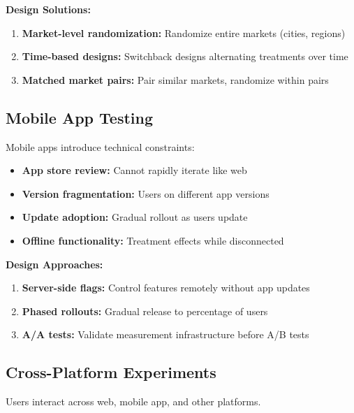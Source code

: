 \textbf{Design Solutions:}

\begin{enumerate}
    \item \textbf{Market-level randomization:} Randomize entire markets (cities, regions)

    \item \textbf{Time-based designs:} Switchback designs alternating treatments over time

    \item \textbf{Matched market pairs:} Pair similar markets, randomize within pairs
\end{enumerate}

\subsection{Mobile App Testing}

Mobile apps introduce technical constraints:

\begin{itemize}
    \item \textbf{App store review:} Cannot rapidly iterate like web
    \item \textbf{Version fragmentation:} Users on different app versions
    \item \textbf{Update adoption:} Gradual rollout as users update
    \item \textbf{Offline functionality:} Treatment effects while disconnected
\end{itemize}

\textbf{Design Approaches:}

\begin{enumerate}
    \item \textbf{Server-side flags:} Control features remotely without app updates

    \item \textbf{Phased rollouts:} Gradual release to percentage of users

    \item \textbf{A/A tests:} Validate measurement infrastructure before A/B tests
\end{enumerate}

\subsection{Cross-Platform Experiments}

Users interact across web, mobile app, and other platforms.

